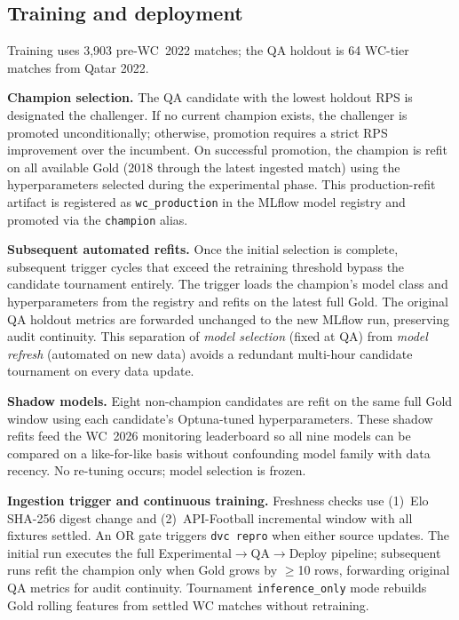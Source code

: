 \documentclass[conference]{IEEEtran}
\begin{document}
\subsection{Training and deployment}
\label{sec:impl_deploy}

Training uses 3{,}903 pre-WC~2022 matches; the QA holdout is 64 WC-tier
matches from Qatar 2022.

\textbf{Champion selection.}
The QA candidate with the lowest holdout RPS is designated the challenger.
If no current champion exists, the challenger is promoted unconditionally;
otherwise, promotion requires a strict RPS improvement over the incumbent.
On successful promotion, the champion is refit on all available Gold
(2018 through the latest ingested match) using the hyperparameters selected
during the experimental phase.
This production-refit artifact is registered as \texttt{wc\_production} in
the MLflow model registry and promoted via the \texttt{champion} alias.

\textbf{Subsequent automated refits.}
Once the initial selection is complete, subsequent trigger cycles that
exceed the retraining threshold bypass the candidate tournament entirely.
The trigger loads the champion's model class and hyperparameters from the
registry and refits on the latest full Gold.
The original QA holdout metrics are forwarded unchanged to the new MLflow
run, preserving audit continuity.
This separation of \emph{model selection} (fixed at QA) from
\emph{model refresh} (automated on new data) avoids a redundant multi-hour
candidate tournament on every data update.

\textbf{Shadow models.}
Eight non-champion candidates are refit on the same full Gold window using
each candidate's Optuna-tuned hyperparameters.
These shadow refits feed the WC~2026 monitoring leaderboard so all nine models
can be compared on a like-for-like basis without confounding model family with
data recency.
No re-tuning occurs; model selection is frozen.

\textbf{Ingestion trigger and continuous training.}
Freshness checks use (1)~Elo SHA-256 digest change and (2)~API-Football
incremental window with all fixtures settled.
An OR gate triggers \texttt{dvc repro} when either source updates.
The initial run executes the full
Experimental$\to$QA$\to$Deploy pipeline; subsequent runs refit the champion
only when Gold grows by $\geq$10 rows, forwarding original QA metrics for
audit continuity.
Tournament \texttt{inference\_only} mode rebuilds Gold rolling features from
settled WC matches without retraining.
\end{document}
